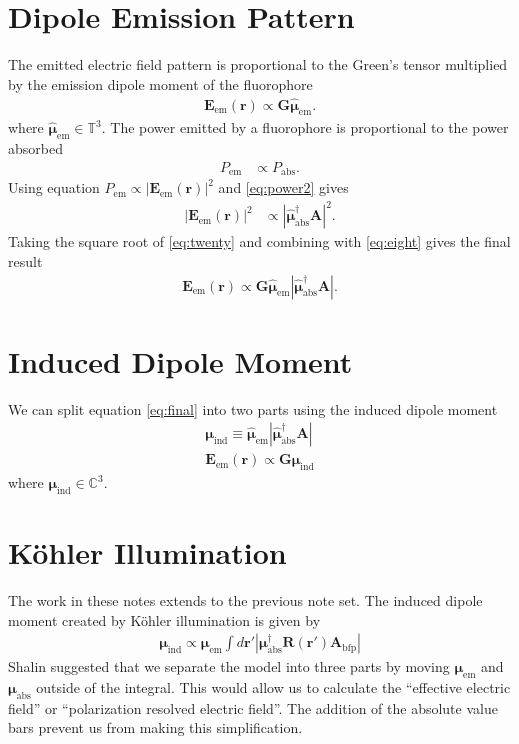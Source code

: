 \documentclass[11pt]{article}
\providecommand{\mb}[1]{\mathbf{#1}}
\providecommand{\bs}[1]{\boldsymbol{#1}}
\begin{document}
\section{Dipole Emission Pattern}
The emitted electric field pattern is proportional to the Green's
tensor multiplied by the emission dipole moment of the fluorophore
\begin{align}
  \mb{E}_{\text{em}}(\mb{r}) \propto \mb{G}\hat{\bs{\mu}}_{\text{em}}.\label{eq:eight}
\end{align}
where $\hat{\bs{\mu}}_{\text{em}} \in \mathbb{T}^3$.
The power emitted by a fluorophore is proportional to the power absorbed
\begin{align}
  P_{\text{em}} &\propto P_{\text{abs}}. 
\end{align}
Using equation $P_{\text{em}} \propto |\mb{E}_{\text{em}}(\mb{r})|^2$ and \ref{eq:power2} gives
\begin{align}
  |\mb{E}_{\text{em}}(\mb{r})|^2 &\propto |\hat{\bs{\mu}}_{\text{abs}}^{\dagger}\mb{A}|^2.\label{eq:twenty}
\end{align}
Taking the square root of \ref{eq:twenty} and combining with \ref{eq:eight} gives the final result
\begin{align}
  \mb{E}_{\text{em}}(\mb{r}) \propto \mb{G}\hat{\bs{\mu}}_{\text{em}}|\hat{\bs{\mu}}^{\dagger}_{\text{abs}}\mb{A}|. \label{eq:final}
\end{align}

\section{Induced Dipole Moment}
We can split equation \ref{eq:final} into two parts using the induced dipole
moment
\begin{align}
  \bs{\mu}_{\text{ind}} \equiv \hat{\bs{\mu}}_{\text{em}}|\hat{\bs{\mu}}^{\dagger}_{\text{abs}}\mb{A}|\\
  \mb{E}_{\text{em}}(\mb{r}) \propto \mb{G}\bs{\mu}_{\text{ind}}
\end{align}
where $\bs{\mu}_{\text{ind}} \in \mathbb{C}^3$. 

\section{K\"{o}hler Illumination}
The work in these notes extends to the previous note set. The induced dipole
moment created by K\"{o}hler illumination is given by
\begin{align}
  \bs{\mu}_{\text{ind}} \propto
  \bs{\mu}_{\text{em}} \int d\mb{r'}
  \left|\bs{\mu}_{\text{abs}}^{\dagger} \mb{R}(\mb{r'})\mb{A}_{\text{bfp}}\right| \label{eq:test2}
\end{align}
Shalin suggested that we separate the model into three parts by moving
$\bs{\mu}_{\text{em}}$ and $\bs{\mu}_{\text{abs}}$ outside of the integral. This
would allow us to calculate the ``effective electric field'' or ``polarization resolved
electric field''. The addition of the absolute value bars prevent us from making this simplification.
\end{document}
